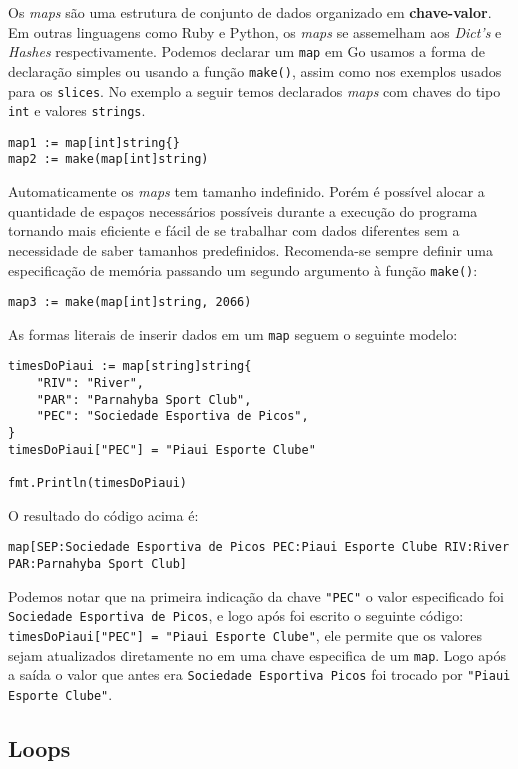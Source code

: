 \documentclass{SBCbookchapter}
\begin{document}
Os \textit{maps} são uma estrutura de conjunto de dados organizado em \textbf{chave-valor}. Em outras linguagens como Ruby e Python, os \textit{maps} se assemelham aos \textit{Dict's} e \textit{Hashes} respectivamente. Podemos declarar um \texttt{map} em Go usamos a forma de declaração simples ou usando a função \texttt{make()}, assim como nos exemplos usados para os \texttt{slices}. No exemplo a seguir temos declarados \textit{maps} com chaves do tipo \texttt{int} e valores \texttt{strings}.

\begin{lstlisting}
map1 := map[int]string{}
map2 := make(map[int]string)
\end{lstlisting}

Automaticamente os \textit{maps} tem tamanho indefinido. Porém é possível alocar a quantidade de espaços necessários possíveis durante a execução do programa tornando mais eficiente e fácil de se trabalhar com dados diferentes sem a necessidade de saber tamanhos predefinidos. Recomenda-se sempre definir uma especificação de memória passando um segundo argumento à função \texttt{make()}:   

\begin{lstlisting}
map3 := make(map[int]string, 2066)
\end{lstlisting}
As formas literais de inserir dados em um \texttt{map} seguem o seguinte modelo:


\begin{lstlisting}
timesDoPiaui := map[string]string{
	"RIV": "River",
	"PAR": "Parnahyba Sport Club",
	"PEC": "Sociedade Esportiva de Picos",
}
timesDoPiaui["PEC"] = "Piaui Esporte Clube"

fmt.Println(timesDoPiaui)
\end{lstlisting}

O resultado do código acima é:

\noindent\texttt{map[SEP:Sociedade Esportiva de Picos PEC:Piaui Esporte Clube RIV:River PAR:Parnahyba Sport Club]}

Podemos notar que na primeira indicação da chave \texttt{"PEC"} o valor especificado foi \texttt{Sociedade Esportiva de Picos}, e logo após foi escrito o seguinte código: \texttt{timesDoPiaui["PEC"] = "Piaui Esporte Clube"}, ele permite que os valores sejam atualizados diretamente no em uma chave especifica de um \texttt{map}. Logo após a saída o valor que antes era \texttt{Sociedade Esportiva Picos} foi trocado por \texttt{"Piaui Esporte Clube"}.
\subsection{Loops}
\end{document}
